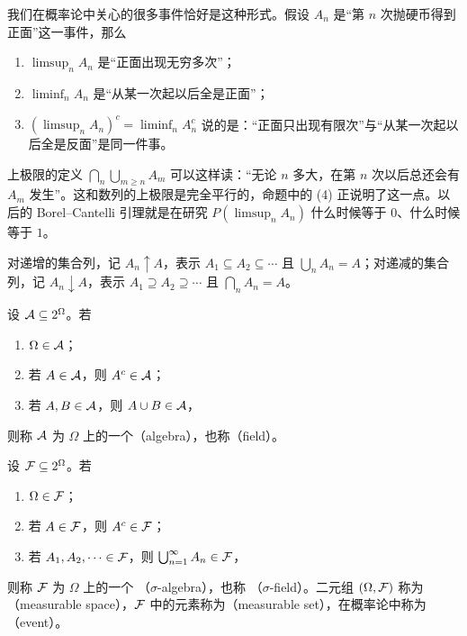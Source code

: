 \begin{remark}[上极限与下极限的概率意义]
我们在概率论中关心的很多事件恰好是这种形式。假设 $A_n$ 是“第 $n$ 次抛硬币得到正面”这一事件，那么
\begin{enumerate}
\item $\limsup_nA_n$ 是“正面出现无穷多次”；
\item $\liminf_nA_n$ 是“从某一次起以后全是正面”；
\item $(\limsup_nA_n)^c=\liminf_nA_n^c$ 说的是：“正面只出现有限次”与“从某一次起以后全是反面”是同一件事。
\end{enumerate}
上极限的定义 $\bigcap_n\bigcup_{m\geqslant n}A_m$ 可以这样读：“无论 $n$ 多大，在第 $n$ 次以后总还会有 $A_m$ 发生”。这和数列的上极限是完全平行的，命题中的 (4) 正说明了这一点。以后的 Borel--Cantelli 引理就是在研究 $P(\limsup_nA_n)$ 什么时候等于 $0$、什么时候等于 $1$。
\end{remark}

对递增的集合列，记 $A_n\uparrow A$，表示 $A_1\subseteq A_2\subseteq\cdots$ 且 $\bigcup_nA_n=A$；对递减的集合列，记 $A_n\downarrow A$，表示 $A_1\supseteq A_2\supseteq\cdots$ 且 $\bigcap_nA_n=A$。


\begin{definition}[代数]\label{def:set-systems:algebra}
设 $\mathcal{A}\subseteq2^\Omega$。若
\begin{enumerate}
\item $\Omega\in\mathcal{A}$；
\item 若 $A\in\mathcal{A}$，则 $A^c\in\mathcal{A}$；
\item 若 $A,B\in\mathcal{A}$，则 $A\cup B\in\mathcal{A}$，
\end{enumerate}
则称 $\mathcal{A}$ 为 $\Omega$ 上的一个（algebra），也称（field）。
\end{definition}

\begin{definition}[$\sigma$-代数]\label{def:set-systems:sigma-algebra}
设 $\mathcal{F}\subseteq2^\Omega$。若
\begin{enumerate}
\item $\Omega\in\mathcal{F}$；
\item 若 $A\in\mathcal{F}$，则 $A^c\in\mathcal{F}$；
\item 若 $A_1,A_2,\dots\in\mathcal{F}$，则 $\bigcup_{n=1}^\infty A_n\in\mathcal{F}$，
\end{enumerate}
则称 $\mathcal{F}$ 为 $\Omega$ 上的一个 （$\sigma$-algebra），也称 （$\sigma$-field）。二元组 $(\Omega,\mathcal{F})$ 称为（measurable space），$\mathcal{F}$ 中的元素称为（measurable set），在概率论中称为（event）。
\end{definition}

